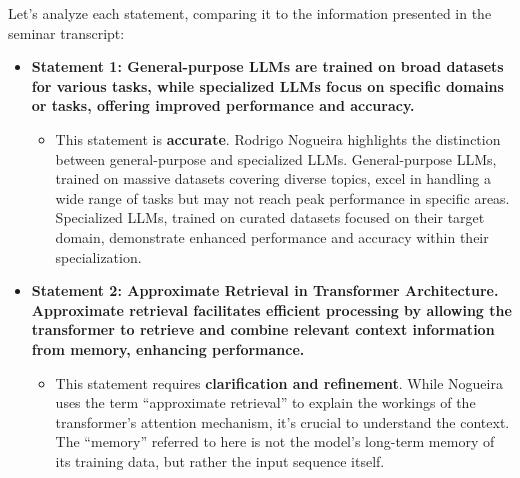 \documentclass[
]{article}
\author{}
\date{}
\begin{document}
Let's analyze each statement, comparing it to the information presented
in the seminar transcript:

\begin{itemize}
\item
  \textbf{Statement 1: General-purpose LLMs are trained on broad
  datasets for various tasks, while specialized LLMs focus on specific
  domains or tasks, offering improved performance and accuracy.}

  \begin{itemize}
  
  \item
    This statement is \textbf{accurate}. Rodrigo Nogueira highlights the
    distinction between general-purpose and specialized LLMs.
    General-purpose LLMs, trained on massive datasets covering diverse
    topics, excel in handling a wide range of tasks but may not reach
    peak performance in specific areas. Specialized LLMs, trained on
    curated datasets focused on their target domain, demonstrate
    enhanced performance and accuracy within their specialization.
  \end{itemize}
\item
  \textbf{Statement 2: Approximate Retrieval in Transformer
  Architecture. Approximate retrieval facilitates efficient processing
  by allowing the transformer to retrieve and combine relevant context
  information from memory, enhancing performance.}

  \begin{itemize}
  \item
    This statement requires \textbf{clarification and refinement}. While
    Nogueira uses the term ``approximate retrieval'' to explain the
    workings of the transformer's attention mechanism, it's crucial to
    understand the context. The ``memory'' referred to here is not the
    model's long-term memory of its training data, but rather the input
    sequence itself.

    \begin{itemize}
    

\end{itemize}
\end{itemize}
\end{itemize}
\end{document}
